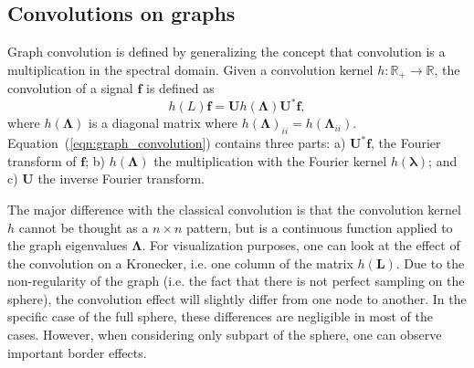 \documentclass[final,twocolumn,3p,times,authoryear]{elsarticle}
\newcommand{\todo}[1]{{\color[rgb]{.6,.1,.6}{#1}}}
\newcommand{\assign}[1]{{\color[rgb]{.8,.5,.8}{Assigned: #1 }}}
\newcommand{\eqnref}[1]{(\ref{eqn:#1})}
\renewcommand{\b}[1]{{\bm{#1}}}   %
\newcommand{\1}{\b{1}}              %
\newcommand{\0}{\b{0}}              %
\renewcommand{\L}{\b{L}} %
\newcommand{\U}{\b{U}}
\newcommand{\bLambda}{\b{\Lambda}}
\newcommand{\blambda}{\b{\lambda}}
\begin{document}
\subsection{Convolutions on graphs}
\assign{Nathanaël, Michaël} \todo{Add a few extra references}

Graph convolution is defined by generalizing the concept that convolution is a
multiplication in the spectral domain. Given a convolution kernel
$h:\mathbb{R}_+\rightarrow\mathbb{R}$, the convolution of a signal $\b{f}$
is defined as
\begin{equation} \label{eqn:graph_convolution}
h(L)\b{f} = \U h(\bLambda) \U^* \b{f},
\end{equation}
where $h(\bLambda)$ is a diagonal matrix where $h(\bLambda)_{ii}=h(\bLambda_{ii})$.
Equation~\eqnref{graph_convolution} contains three parts: a) $\U^* \b{f}$, the
Fourier transform of $\b{f}$; b) $h(\bLambda)$ the multiplication with the Fourier
kernel $h(\blambda)$; and c) $\U$ the inverse Fourier transform.

The major difference with the classical convolution is that the convolution kernel
$h$ cannot be thought as a $n \times n$ pattern, but is a continuous function
applied to the graph eigenvalues $\bLambda$. For visualization purposes, one can
look at the effect of the convolution on a Kronecker, i.e. one column of the matrix
$h(\L)$. 
Due to the non-regularity of the graph (i.e. the fact
that there is not perfect sampling on the sphere), the convolution effect will slightly
differ from one node to another. In the specific case of the full sphere, these
differences are negligible in most of the cases. However, when considering only subpart of
the sphere, one can observe important border effects.
\end{document}
